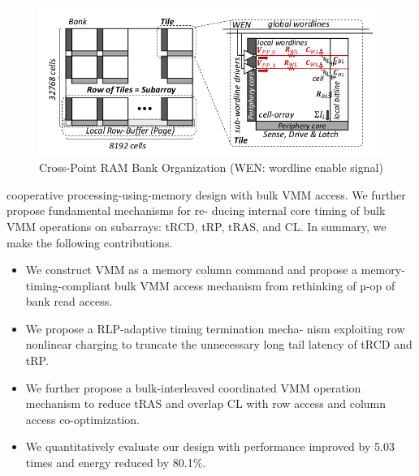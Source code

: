 \documentclass{article}
\begin{document}
 		\begin{figure}[h]
 			\centering
 			\includegraphics[width=0.7\linewidth]{images/fig2}
 			\caption{Cross-Point RAM Bank Organization (WEN: wordline enable signal)}
 			\label{fig:fig2}
 		\end{figure}
 		
 		cooperative processing-using-memory design with bulk VMM
 		access. We further propose fundamental mechanisms for re-
 		ducing internal core timing of bulk VMM operations on
 		subarrays: tRCD, tRP, tRAS, and CL. In summary, we make
 		the following contributions.
 		\begin{itemize}
 			\item We construct VMM as a memory column command and
 			propose a memory-timing-compliant bulk VMM access
 			mechanism from rethinking of µ-op of bank read access.
 			\item We propose a RLP-adaptive timing termination mecha-
 			nism exploiting row nonlinear charging to truncate the
 			unnecessary long tail latency of tRCD and tRP.
 			\item We further propose a bulk-interleaved coordinated VMM
 			operation mechanism to reduce tRAS and overlap CL
 			with row access and column access co-optimization.
 			\item We quantitatively evaluate our design with performance
 			improved by 5.03 times and energy reduced by 80.1\%.
 		\end{itemize}
 	
\end{document}
